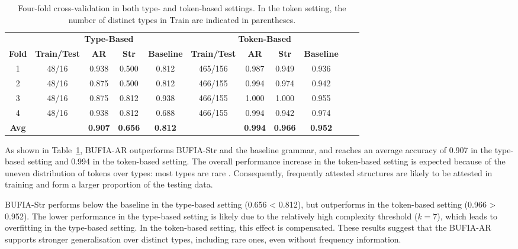\documentclass{CUP-JNL-PHO}%
\theoremstyle{definition}
\numberwithin{equation}{section}
\theoremstyle{definition}
\begin{document}
\begin{table}
	\setlength{\tabcolsep}{4pt}
	\begin{tabular}{ccccccccccc}
		\toprule
		& \multicolumn{4}{c}{\textbf{Type-Based}} & \multicolumn{4}{c}{\textbf{Token-Based}} \\
		\cmidrule(lr){2-5} \cmidrule(lr){6-9}
		\textbf{Fold} 
		& \textbf{Train/Test}
		& \textbf{AR} & \textbf{Str} & \textbf{Baseline}
		& \textbf{Train/Test}
		& \textbf{AR} & \textbf{Str} & \textbf{Baseline} \\
		\midrule
		
		1 & 48/16 
		& 0.938 & 0.500 & 0.812
		& 465/156 
		& 0.987 & 0.949 & 0.936 \\
		
		2 & 48/16 
		& 0.875 & 0.500 & 0.812
		& 466/155
		& 0.994 & 0.974 & 0.942 \\
		
		3 & 48/16 
		& 0.875 & 0.812 & 0.938
		& 466/155
		& 1.000 & 1.000 & 0.955 \\
		
		4 & 48/16 
		& 0.938 & 0.812 & 0.688
		& 466/155
		& 0.994 & 0.942 & 0.974 \\
		
		\midrule
		\textbf{Avg} 
		& 
		& \textbf{0.907} & \textbf{0.656} & \textbf{0.812}
		& 
		& \textbf{0.994} & \textbf{0.966} & \textbf{0.952} \\
		
		\bottomrule
	\end{tabular}
	\caption{Four-fold cross-validation in both type- and token-based settings. In the token setting, the number of distinct types in Train are indicated in parentheses.}
	\label{sec4.tab.crosvalid}
\end{table}


As shown in Table~\ref{sec4.tab.crosvalid}, BUFIA-AR outperforms
BUFIA-Str and the baseline grammar, and reaches an average accuracy of 0.907 
in the type-based setting and 0.994 in the token-based setting. 
The overall performance increase in the token-based setting is expected because of the uneven distribution of tokens over types: most types are rare \citep{Yang2013}. Consequently, frequently attested structures are likely to be attested in training and form a larger proportion of the testing data.

BUFIA-Str performs below the baseline in the type-based 
setting (0.656 < 0.812), but outperforms in the token-based setting 
(0.966 > 0.952). The lower performance in the 
type-based setting is likely due to the relatively high complexity 
threshold ($k=7$), which leads to overfitting in the type-based setting.
In the token-based setting, this effect is compensated.
These results suggest that the BUFIA-AR supports 
stronger generalisation over distinct types, including rare ones,
even without frequency information.
\end{document}
